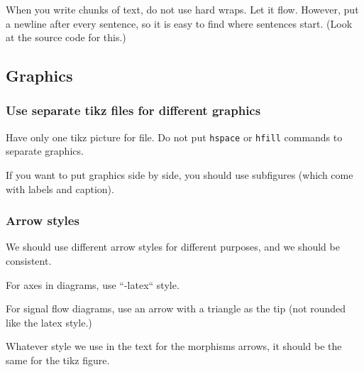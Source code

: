 When you write chunks of text, do not use hard wraps. %
Let it flow. %
However, put a newline after every sentence, so it is easy to find where sentences start.
(Look at the source code for this.)


\subsection*{Graphics}

\subsubsection*{Use separate tikz files for different graphics}

Have only one tikz picture for file.
Do not put \texttt{hspace} or \texttt{hfill} commands to separate graphics.


If you want to put graphics side by side, you should use subfigures (which come with labels and caption).


\subsubsection*{Arrow styles}

We should use different arrow styles for different purposes,
and we should be consistent.

For axes in diagrams, use ``-latex`` style.

For signal flow diagrams, use an arrow with a triangle as the tip (not rounded like the latex style.)

Whatever style we use in the text for the morphisms arrows, it should be the same for the tikz figure.






